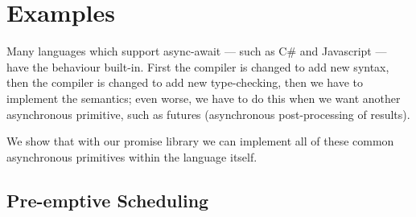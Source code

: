 \documentclass[msc,deptreport,cs]{infthesis} %
\newcommand{\code}[1]{\lstinline{#1}}
\begin{document}


\chapter{Examples}
\label{chap:examples}



Many languages which support async-await --- such as C# and Javascript --- have
the behaviour built-in. First the compiler is changed to add new syntax, then
the compiler is changed to add new type-checking, then we have to implement the
semantics; even worse, we have to do this when we want another asynchronous
primitive, such as futures (asynchronous post-processing of results).

We show that with our promise library we can implement all of these common
asynchronous primitives within the language itself.

\section{Pre-emptive Scheduling}
\label{sec:pre-emptive-scheduling}

\end{document}
